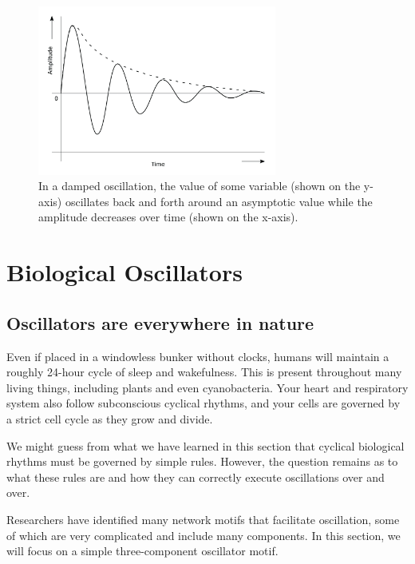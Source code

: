 \begin{figure}[h]
\centering
\mySfFamily
\includegraphics[width = 0.7\textwidth]{../images_CMYK/damped_oscillator}
\caption{In a damped oscillation, the value of some variable (shown on the y-axis) oscillates back and forth around an asymptotic value while the amplitude decreases over time (shown on the x-axis).}
\label{fig:damped_oscillator}
\end{figure}

\FloatBarrier
{}

\section{Biological Oscillators}
\label{sec:biological_oscillators}

\subsection{Oscillators are everywhere in nature}

Even if placed in a windowless bunker without clocks, humans will maintain a roughly 24-hour cycle of sleep and wakefulness. This  is present throughout many living things, including plants and even cyanobacteria. Your heart and respiratory system also follow subconscious cyclical rhythms, and your cells are governed by a strict cell cycle as they grow and divide.

We might guess from what we have learned in this section that cyclical biological rhythms must be governed by simple rules. However, the question remains as to what these rules are and how they can correctly execute oscillations over and over.

Researchers have identified many network motifs that facilitate oscillation, some of which are very complicated and include many components. In this section, we will focus on a simple three-component oscillator motif.

